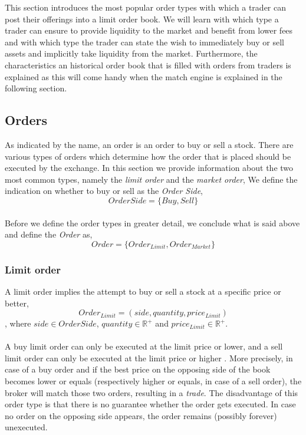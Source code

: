 This section introduces the most popular order types with which a trader can post their offerings into a limit order book.
We will learn with which type a trader can ensure to provide liquidity to the market and benefit from lower fees and with which type the trader can state the wish to immediately buy or sell assets and implicitly take liquidity from the market.
Furthermore, the characteristics an historical order book that is filled with orders from traders is explained as this will come handy when the match engine is explained in the following section.

\subsection{Orders}
\label{sec:orders}

As indicated by the name, an order is an order to buy or sell a stock.
There are various types of orders which determine how the order that is placed should be executed by the exchange.
In this section we provide information about the two most common types, namely the \textit{limit order} and the \textit{market order},
We define the indication on whether to buy or sell as the \textit{Order Side},
\begin{equation}\label{eq:order-side}
    OrderSide=\{Buy, Sell\}
\end{equation}
\\
Before we define the order types in greater detail, we conclude what is said above and define the \textit{Order} as,
\begin{equation}\label{eq:order}
Order=\{Order_{Limit}, Order_{Market}\}
\end{equation}

\subsubsection{Limit order}
\label{sec:limit-order}

A limit order implies the attempt to buy or sell a stock at a specific price or better,
\begin{equation}\label{eq:order-limit}
    Order_{Limit}=(side, quantity, price_{Limit})
\end{equation}
, where $side \in OrderSide$, $quantity \in \mathbb{R^+}$ and $price_{Limit} \in \mathbb{R^+}$.
\\
\\
A buy limit order can only be executed at the limit price or lower, and a sell limit order can only be executed at the limit price or higher \cite{sec-limit-order}.
More precisely, in case of a buy order and if the best price on the opposing side of the book becomes lower or equals (respectively higher or equals, in case of a sell order), the broker will match those two orders, resulting in a \textit{trade}.
The disadvantage of this order type is that there is no guarantee whether the order gets executed.
In case no order on the opposing side appears, the order remains (possibly forever) unexecuted.

